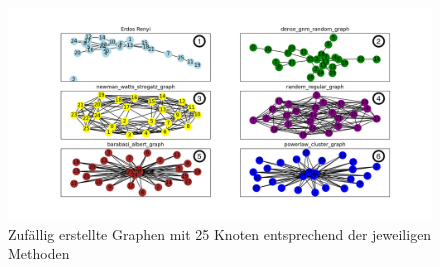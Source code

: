 \FloatBarrier
\begin{figure}[h!]
    \centering
    \hspace*{-1.5cm}
    \includegraphics[width=1.2\textwidth]{Graphics/6Random.png}
    \caption{Zufällig erstellte Graphen mit 25 Knoten entsprechend der jeweiligen Methoden}
    \label{RandomGraphen}
\end{figure}
\newpage


